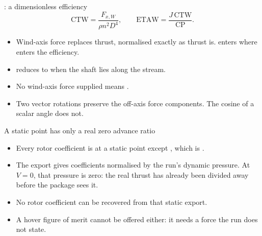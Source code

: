 \begin{frame}{: a dimensionless efficiency}
\[
  \mathrm{CTW}=\frac{F_{x,W}}{\rho n^2D^4},
  \qquad
  \mathrm{ETAW}=\frac{J\,\mathrm{CTW}}{\mathrm{CP}}.
\]
\begin{itemize}\small
  \item Wind-axis force replaces thrust, normalised exactly as thrust is.
         enters where  enters the efficiency.
  \item {} reduces to  when the shaft lies along the stream.
  \item No wind-axis force supplied means .
  \item Two vector rotations preserve the off-axis force components.
        The cosine of a scalar angle does not.
\end{itemize}
\end{frame}

\begin{frame}{A static point has only a real zero advance ratio}
\begin{itemize}\small
  \item Every rotor coefficient is  at a static point except
        , which is .
  \item The export gives coefficients normalised by the run's dynamic pressure.
        At $V=0$, that pressure is zero: the real thrust has already been
        divided away before the package sees it.
  \item No rotor coefficient can be recovered from that static export.
  \item A hover figure of merit cannot be offered either: it needs a force
        the run does not state.
\end{itemize}
\end{frame}
